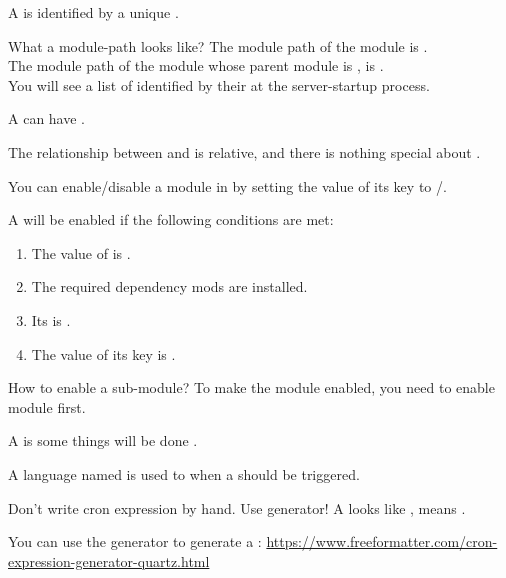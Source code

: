 A  is identified by a unique .

\begin{example}{What a module-path looks like?}
    The module path of the module  is . \\
    The module path of the module  whose parent module is , is . \\
    You will see a list of  identified by their  at the server-startup process.
\end{example}

A  can have .

The relationship between  and  is relative, and there is nothing special about .

You can enable/disable a module in  by setting the value of its  key to /.

\begin{samepage}
    A  will be enabled if the following conditions are met:
    \begin{enumerate}
        \item The value of  is .
        \item The required dependency mods are installed.
        \item Its  is .
        \item The value of its  key is .
    \end{enumerate}
\end{samepage}

\begin{example}{How to enable a sub-module?}
    To make the module  enabled, you need to enable  module first.
\end{example}


\clearpage
{}\label{sec:job}

A  is some things will be done .

A language named  is used to  when a  should be triggered.

\begin{tips}{Don't write cron expression by hand. Use generator!}
    A  looks like , means .

    You can use the generator to generate a :
    \url{https://www.freeformatter.com/cron-expression-generator-quartz.html}
\end{tips}

